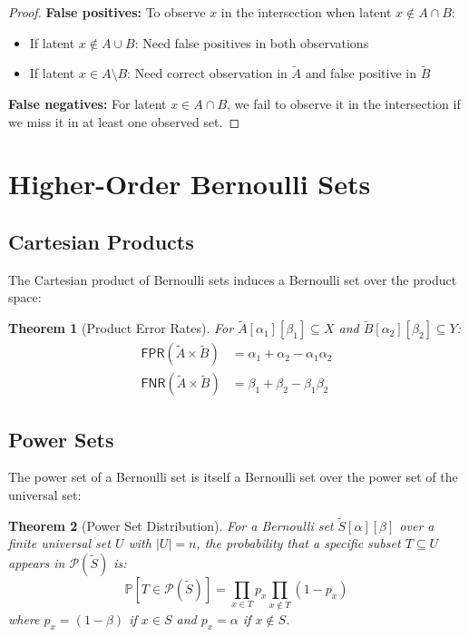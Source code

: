 \documentclass[11pt,final,hidelinks]{article}
\newtheorem{theorem}{Theorem}[section]
\newcommand{\obs}[1]{\widetilde{#1}}  %
\newcommand{\PS}[1]{\mathcal{P}(#1)}
\newcommand{\Prob}[1]{\mathbb{P}\left[#1\right]}
\newcommand{\Card}[1]{\lvert#1\rvert}
\newcommand{\fprate}{\alpha}
\newcommand{\fnrate}{\beta}
\newcommand{\FPR}{\mathsf{FPR}}
\newcommand{\FNR}{\mathsf{FNR}}
\begin{document}
\begin{proof}
\textbf{False positives:} To observe $x$ in the intersection when latent $x \notin A \cap B$:
\begin{itemize}
    \item If latent $x \notin A \cup B$: Need false positives in both observations
    \item If latent $x \in A \setminus B$: Need correct observation in $\obs{A}$ and false positive in $\obs{B}$
\end{itemize}

\textbf{False negatives:} For latent $x \in A \cap B$, we fail to observe it in the intersection if we miss it in at least one observed set.
\end{proof}

\section{Higher-Order Bernoulli Sets}

\subsection{Cartesian Products}

The Cartesian product of Bernoulli sets induces a Bernoulli set over the product space:

\begin{theorem}[Product Error Rates]
For $\obs{A}[\fprate_1][\fnrate_1] \subseteq X$ and $\obs{B}[\fprate_2][\fnrate_2] \subseteq Y$:
\begin{align}
\FPR(\obs{A} \times \obs{B}) &= \fprate_1 + \fprate_2 - \fprate_1\fprate_2 \\
\FNR(\obs{A} \times \obs{B}) &= \fnrate_1 + \fnrate_2 - \fnrate_1\fnrate_2
\end{align}
\end{theorem}

\subsection{Power Sets}

The power set of a Bernoulli set is itself a Bernoulli set over the power set of the universal set:

\begin{theorem}[Power Set Distribution]
For a Bernoulli set $\obs{S}[\fprate][\fnrate]$ over a finite universal set $U$ with $\Card{U} = n$, the probability that a specific subset $T \subseteq U$ appears in $\PS{\obs{S}}$ is:
\begin{equation}
\Prob{T \in \PS{\obs{S}}} = \prod_{x \in T} p_x \prod_{x \notin T} (1-p_x)
\end{equation}
where $p_x = (1-\fnrate)$ if $x \in S$ and $p_x = \fprate$ if $x \notin S$.
\end{theorem}
\end{document}
